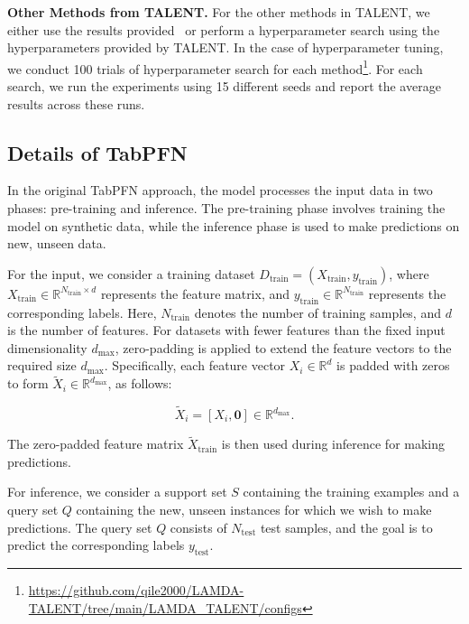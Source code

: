 \textbf{Other Methods from TALENT.}
For the other methods in TALENT, we either use the results provided~\cite{YeACloser} or perform a hyperparameter search using the hyperparameters provided by TALENT. In the case of hyperparameter tuning, we conduct 100 trials of hyperparameter search for each method\footnote{\href{https://github.com/qile2000/LAMDA-TALENT/tree/main/LAMDA_TALENT/configs}{https://github.com/qile2000/LAMDA-TALENT/tree/main/LAMDA\_TALENT/configs}}. For each search, we run the experiments using 15 different seeds and report the average results across these runs.

\subsection{Details of TabPFN}
\label{appendix:details_of_pfn}

In the original TabPFN approach, the model processes the input data in two phases: pre-training and inference. The pre-training phase involves training the model on synthetic data, while the inference phase is used to make predictions on new, unseen data.

For the input, we consider a training dataset \( D_{\text{train}} = (X_{\text{train}}, y_{\text{train}}) \), where \( X_{\text{train}} \in \mathbb{R}^{N_{\text{train}} \times d} \) represents the feature matrix, and \( y_{\text{train}} \in \mathbb{R}^{N_{\text{train}}} \) represents the corresponding labels. Here, \( N_{\text{train}} \) denotes the number of training samples, and \( d \) is the number of features. For datasets with fewer features than the fixed input dimensionality \( d_{\max} \), zero-padding is applied to extend the feature vectors to the required size \( d_{\max} \). Specifically, each feature vector \( X_i \in \mathbb{R}^d \) is padded with zeros to form \( \tilde{X}_i \in \mathbb{R}^{d_{\max}} \), as follows:

\[
\tilde{X}_i = \left[ X_i, \mathbf{0} \right] \in \mathbb{R}^{d_{\max}}.
\]

The zero-padded feature matrix \( \tilde{X}_{\text{train}} \) is then used during inference for making predictions.

For inference, we consider a support set \( S \) containing the training examples and a query set \( Q \) containing the new, unseen instances for which we wish to make predictions. The query set \( Q \) consists of \( N_{\text{test}} \) test samples, and the goal is to predict the corresponding labels \( y_{\text{test}} \).

